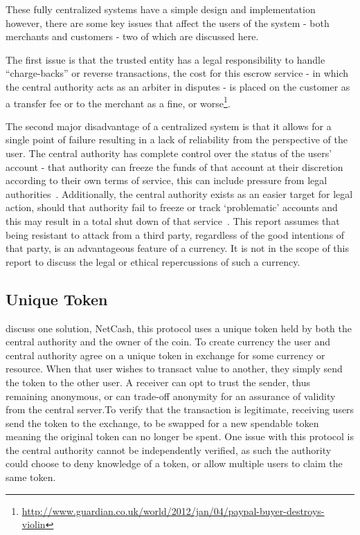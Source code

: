 These fully centralized systems have a simple design and implementation however, there are some key issues that affect the users of the system - both merchants and customers - two of which are discussed here.  

The first issue is that the trusted entity has a legal responsibility to handle ``charge-backs'' or reverse transactions, the cost for this escrow service - in which the central authority acts as an arbiter in disputes - is placed on the customer as a transfer fee or to the merchant as a fine, or worse\footnote{\url{http://www.guardian.co.uk/world/2012/jan/04/paypal-buyer-destroys-violin}}.

The second major disadvantage of a centralized system is that it allows for  a single point of failure resulting in a lack of reliability from the  perspective of the user.  The central authority has complete control over the status of the users' account - that authority can freeze the funds of that account at their discretion according to their own terms of service, this can include pressure from legal authorities~\cite{mtgox-dwolla,vlad:mtgox-dwolla,wikileaks-paypal}.  Additionally, the central authority exists as an easier target for legal action, should that authority fail to freeze or track `problematic' accounts and this may result in a total shut down of that service~\cite{lr-shutdown,egold-shutdown}. This report assumes that being resistant to attack from a third party, regardless of the good intentions of that party, is an advantageous feature of a currency.  It is not in the scope of this report to discuss the legal or ethical repercussions of such a currency.

\subsection{Unique Token}\textcite{netcash} discuss one solution, NetCash, this protocol uses a unique token held by both the central authority and the owner of the coin. To create currency the user and central authority agree on a unique token in exchange for some currency or resource. When that user wishes to transact value to another, they simply send the token to the other user.  A receiver can opt to trust the sender, thus remaining anonymous, or can trade-off anonymity for an assurance of validity from the central server.To verify that the transaction is legitimate, receiving users send the token to the exchange, to be swapped for a new spendable token meaning the original token can no longer be spent. One issue with this protocol is the central authority cannot be independently verified, as such the authority could choose to deny knowledge of
a token, or allow multiple users to claim the same token.


